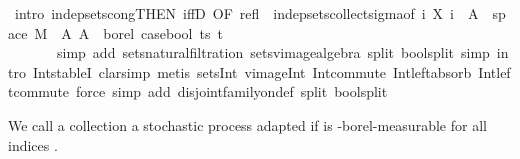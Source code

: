 \begin{isabellebody}
\ {\isacharparenleft}{\kern0pt}intro\ indep{\isacharunderscore}{\kern0pt}sets{\isacharunderscore}{\kern0pt}cong{\isacharbrackleft}{\kern0pt}THEN\ iffD{}{\isacharcomma}{\kern0pt}\ OF\ refl\ {\isacharunderscore}{\kern0pt}\ indep{\isacharunderscore}{\kern0pt}sets{\isacharunderscore}{\kern0pt}collect{\isacharunderscore}{\kern0pt}sigma{\isacharbrackleft}{\kern0pt}of\ {\isachardoublequoteopen}{\isasymlambda}i{\isachardot}{\kern0pt}\ {\isacharbraceleft}{\kern0pt}X\ i\ {\isacharminus}{\kern0pt}{\isacharbackquote}{\kern0pt}\ A\ {\isasyminter}\ space\ M\ {\isacharbar}{\kern0pt}\ A{\isachardot}{\kern0pt}\ A\ {\isasymin}\ borel{\isacharbraceright}{\kern0pt}{\isachardoublequoteclose}\ {\isachardoublequoteopen}case{\isacharunderscore}{\kern0pt}bool\ {\isacharbraceleft}{\kern0pt}ts{\isacharbraceright}{\kern0pt}\ {\isacharbraceleft}{\kern0pt}t{\isacharbraceright}{\kern0pt}{\isachardoublequoteclose}{\isacharbrackright}{\kern0pt}{\isacharbrackright}{\kern0pt}{\isacharparenright}{\kern0pt}\isanewline
\ \ \ \ \ \ \ {\isacharparenleft}{\kern0pt}simp\ add{\isacharcolon}{\kern0pt}\ sets{\isacharunderscore}{\kern0pt}natural{\isacharunderscore}{\kern0pt}filtration\ sets{\isacharunderscore}{\kern0pt}vimage{\isacharunderscore}{\kern0pt}algebra\ split{\isacharcolon}{\kern0pt}\ bool{\isachardot}{\kern0pt}split{\isacharcomma}{\kern0pt}\ simp{\isacharcomma}{\kern0pt}\ intro\ Int{\isacharunderscore}{\kern0pt}stableI{\isacharcomma}{\kern0pt}\ clarsimp{\isacharcomma}{\kern0pt}\ metis\ sets{\isachardot}{\kern0pt}Int\ vimage{\isacharunderscore}{\kern0pt}Int\ Int{\isacharunderscore}{\kern0pt}commute\ Int{\isacharunderscore}{\kern0pt}left{\isacharunderscore}{\kern0pt}absorb\ Int{\isacharunderscore}{\kern0pt}left{\isacharunderscore}{\kern0pt}commute{\isacharcomma}{\kern0pt}\ force\ simp\ add{\isacharcolon}{\kern0pt}\ disjoint{\isacharunderscore}{\kern0pt}family{\isacharunderscore}{\kern0pt}on{\isacharunderscore}{\kern0pt}def\ split{\isacharcolon}{\kern0pt}\ bool{\isachardot}{\kern0pt}split{\isacharparenright}{\kern0pt}\isanewline
{}\isamarkupfalse%
%
\endisatagproof
{\isafoldproof}%
%
\isadelimproof
%
\endisadelimproof
%
\isadelimdocument
%
\endisadelimdocument
%
\isatagdocument
%
\isamarkuptrue%
%
\endisatagdocument
{\isafolddocument}%
%
\isadelimdocument
%
\endisadelimdocument
%
\begin{isamarkuptext}%
We call a collection a stochastic process  adapted if  is -borel-measurable for all indices .%

\end{isamarkuptext}
\end{isabellebody}

